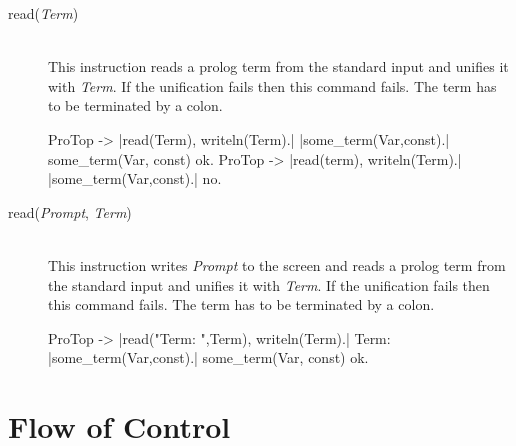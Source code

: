 \begin{description}
  \item [read({\em Term})]\ \\
  This instruction reads a prolog term from the standard input and unifies it
  with {\em Term}. If the unification fails then this command fails. The term
  has to be terminated by a colon.
\begin{BoxedSample}
  ProTop -> |read(Term), writeln(Term).|
   |some_term(Var,const).|
  some\_term(Var, const)
  ok.
  ProTop -> |read(term), writeln(Term).|
   |some_term(Var,const).|
  no.
\end{BoxedSample}

  \item [read({\em Prompt}, {\em Term})]\ \\
  This instruction writes {\em Prompt} to the screen and reads a prolog term
  from the standard input and unifies it with {\em Term}. If the unification
  fails then this command fails. The term has to be terminated by a colon.
\begin{BoxedSample}
  ProTop -> |read("Term: ",Term), writeln(Term).|
  Term:  |some_term(Var,const).|
  some\_term(Var, const)
  ok.
\end{BoxedSample}

\end{description}

\section{Flow of Control}

